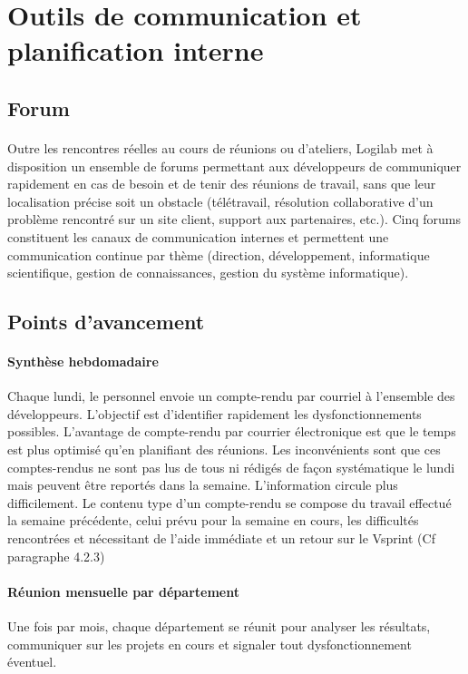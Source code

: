\documentclass {report}
\begin{document}
\section{Outils de communication et planification interne}
\subsection{Forum}
\paragraph{}
Outre les rencontres réelles au cours de réunions ou d’ateliers, Logilab met à disposition un ensemble de forums permettant aux développeurs de communiquer rapidement en cas de besoin et de tenir des réunions de travail, sans que leur localisation précise soit un obstacle (télétravail, résolution collaborative d’un problème rencontré sur un site client, support aux partenaires, etc.). Cinq forums constituent les canaux de communication internes et permettent une communication continue par thème (direction, développement,  informatique scientifique, gestion de connaissances, gestion du système informatique).
\subsection{Points d'avancement}
\paragraph{Synthèse hebdomadaire}
Chaque lundi, le personnel envoie un compte-rendu par courriel à l'ensemble des développeurs. L'objectif est d'identifier rapidement les dysfonctionnements possibles. L'avantage de compte-rendu par courrier électronique est que le temps est plus optimisé qu'en planifiant des réunions. Les inconvénients sont que ces comptes-rendus ne sont pas lus de tous ni rédigés de façon systématique le lundi mais peuvent être reportés dans la semaine. L'information circule plus difficilement. Le contenu type d'un compte-rendu se compose du travail effectué la semaine précédente, celui prévu pour la semaine en cours, les difficultés rencontrées et nécessitant de l'aide immédiate et un retour sur le Vsprint (Cf paragraphe 4.2.3)
\paragraph{Réunion mensuelle par département}
Une fois par mois, chaque département se réunit pour analyser les résultats, communiquer sur les projets en cours et signaler tout dysfonctionnement éventuel.
\end{document}
